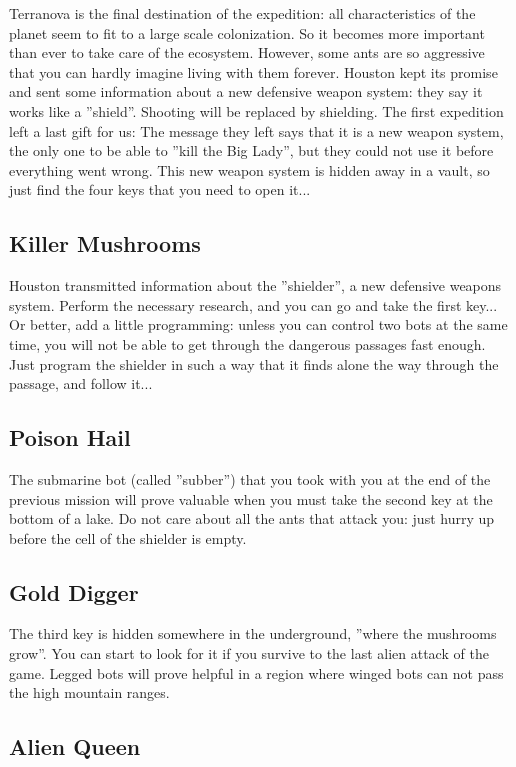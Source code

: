 Terranova is the final destination of the expedition: all characteristics of the planet seem to fit to a large scale colonization. So it becomes more important than ever to take care of the ecosystem. However, some ants are so aggressive that you can hardly imagine living with them forever. Houston kept its promise and sent some information about a new defensive weapon system: they say it works like a ''shield''. Shooting will be replaced by shielding. The first expedition left a last gift for us: The message they left says that it is a new weapon system, the only one to be able to ''kill the Big Lady'', but they could not use it before everything went wrong. This new weapon system is hidden away in a vault, so just find the four keys that you need to open it...


\subsection{Killer Mushrooms}

Houston transmitted information about the ''shielder'', a new defensive weapons system. Perform the necessary research, and you can go and take the first key... Or better, add a little programming: unless you can control two bots at the same time, you will not be able to get through the dangerous passages fast enough. Just program the shielder in such a way that it finds alone the way through the passage, and follow it...


\subsection{Poison Hail}

The submarine bot (called ''subber'') that you took with you at the end of the previous mission will prove valuable when you must take the second key at the bottom of a lake. Do not care about all the ants that attack you: just hurry up before the cell of the shielder is empty.


\subsection{Gold Digger}

The third key is hidden somewhere in the underground, ''where the mushrooms grow''. You can start to look for it if you survive to the last alien attack of the game. Legged bots will prove helpful in a region where winged bots can not pass the high mountain ranges.


\subsection{Alien Queen}

